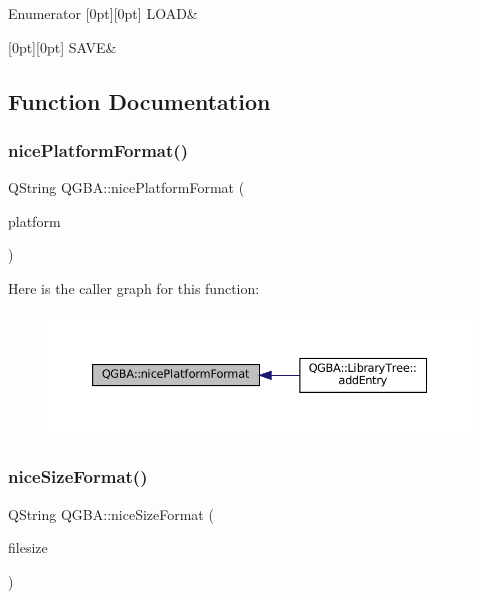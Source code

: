 \begin{DoxyEnumFields}{Enumerator}
[0pt][0pt]{}\mbox{\label{namespace_q_g_b_a_a7943e4735d6f412e1479e456e6f4aca2a615d2885ef7576cedd9aafbb2578f028}} 
L\+O\+AD&\\
\hline

[0pt][0pt]{}\mbox{\label{namespace_q_g_b_a_a7943e4735d6f412e1479e456e6f4aca2af5cf47ab06d0d98b0d16d10c82d87953}} 
S\+A\+VE&\\
\hline

\end{DoxyEnumFields}


\subsection{Function Documentation}
\mbox{\label{namespace_q_g_b_a_ab8bc21cf9ad676836dcf3259c798c90a}} 
\subsubsection{\texorpdfstring{nice\+Platform\+Format()}{nicePlatformFormat()}}
{\footnotesize\ttfamily Q\+String Q\+G\+B\+A\+::nice\+Platform\+Format (\begin{DoxyParamCaption}\item[{m\+Platform}]{platform }\end{DoxyParamCaption})}

Here is the caller graph for this function\+:
\nopagebreak
\begin{figure}[H]
\begin{center}
\leavevmode
\includegraphics[width=350pt]{namespace_q_g_b_a_ab8bc21cf9ad676836dcf3259c798c90a_icgraph}
\end{center}
\end{figure}
\mbox{\label{namespace_q_g_b_a_afe82df4edfd99518e54fedca6cb5d6c0}} 
\subsubsection{\texorpdfstring{nice\+Size\+Format()}{niceSizeFormat()}}
{\footnotesize\ttfamily Q\+String Q\+G\+B\+A\+::nice\+Size\+Format (\begin{DoxyParamCaption}\item[{size\+\_\+t}]{filesize }\end{DoxyParamCaption})}

